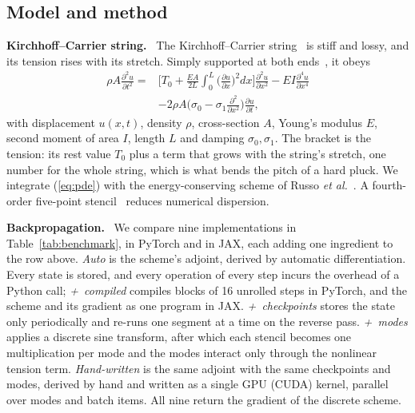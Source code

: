 \documentclass[a4paper]{article}
\newcommand{\head}[1]{\par\vspace{1pt}\noindent\textbf{#1.}\ \ignorespaces}
\begin{document}
\begin{sloppy}
\section{Model and method}
\head{Kirchhoff--Carrier string}
The Kirchhoff--Carrier string~\cite[Sec.~8.1]{bilbao2009} is stiff and lossy,
and its tension rises with its stretch. Simply supported at both
ends~\cite{russo2026}, it obeys
\begin{equation}
\begin{aligned}
\rho A\frac{\partial^2u}{\partial t^2}={}&
 \bigg[T_0+\frac{EA}{2L}\!\int_0^L\!\Big(\frac{\partial u}{\partial x}\Big)^{\!2}dx\bigg]
 \frac{\partial^2u}{\partial x^2}
 -EI\frac{\partial^4u}{\partial x^4}\\
 &-2\rho A\Big(\sigma_0-\sigma_1\frac{\partial^2}{\partial x^2}\Big)
 \frac{\partial u}{\partial t},
\end{aligned}
\label{eq:pde}
\end{equation}
with displacement $u(x,t)$, density $\rho$, cross-section $A$, Young's
modulus $E$, second moment of area $I$, length $L$ and damping
$\sigma_0,\sigma_1$. The bracket is the tension: its rest value $T_0$ plus a
term that grows with the string's stretch, one number for the whole string,
which is what bends the pitch of a hard pluck. We integrate
(\ref{eq:pde}) with the energy-conserving scheme of Russo \emph{et
al.}~\cite{russo2026}. A fourth-order five-point
stencil~\cite[Sec.~6.3.1]{bilbao2009} reduces
numerical dispersion.

\head{Backpropagation}
We compare nine implementations in Table~\ref{tab:benchmark}, in PyTorch
and in JAX, each adding one ingredient to the row above. \emph{Auto} is the
scheme's adjoint, derived by automatic differentiation. Every state is stored, and
every operation of every step incurs the overhead of a Python call;
\emph{+~compiled} compiles blocks of 16 unrolled steps in PyTorch, and the
scheme and its gradient as one program in JAX. \emph{+~checkpoints} stores the state only
periodically and re-runs one segment at a time on the reverse pass.
\emph{+~modes} applies a discrete sine transform, after which each stencil
becomes one multiplication per mode and the modes interact only through the
nonlinear tension term. \emph{Hand-written} is the same adjoint with the
same checkpoints and modes, derived by hand and written as a single GPU
(CUDA\footnotemark) kernel, parallel over modes and batch items. All nine return the
gradient of the discrete scheme.


\end{sloppy}
\end{document}
